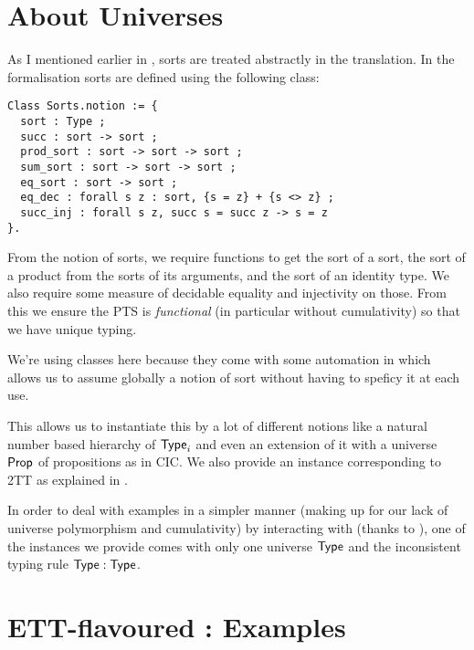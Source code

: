 
\section{About Universes}

As I mentioned earlier in , sorts are treated
abstractly in the translation. In the formalisation sorts are defined using
the following class:
%
\begin{verbatim}
Class Sorts.notion := {
  sort : Type ;
  succ : sort -> sort ;
  prod_sort : sort -> sort -> sort ;
  sum_sort : sort -> sort -> sort ;
  eq_sort : sort -> sort ;
  eq_dec : forall s z : sort, {s = z} + {s <> z} ;
  succ_inj : forall s z, succ s = succ z -> s = z
}.
\end{verbatim}
%
From the notion of sorts, we require functions to get the sort of a sort,
the sort of a product from the sorts of its arguments, and the sort of an
identity type.
We also require some measure of decidable equality and injectivity on those.
From this we ensure the \acrshort{PTS} is \emph{functional} (in particular
without cumulativity) so that we have unique typing.

We're using classes here because they come with some automation in \Coq which
allows us to assume globally a notion of sort without having to speficy it at
each use.

This allows us to instantiate this by a lot of different notions like a natural
number based hierarchy of \(\mathsf{Type}_i\) and even an extension of it with a
universe $\mathsf{Prop}$ of propositions as in \acrshort{CIC}.
We also provide an instance corresponding to \acrshort{2TT} as explained in
.

In order to deal with examples in a simpler manner (making up for our lack of
universe polymorphism and cumulativity) by interacting with \Coq (thanks to
\MetaCoq), one of the instances we provide comes with only one universe $\mathsf{Type}$
and the inconsistent typing rule $\mathsf{Type} : \mathsf{Type}$.

\section{ETT-flavoured \Coq: Examples}

